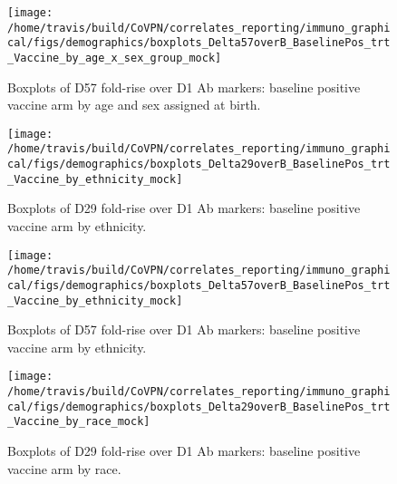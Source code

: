 \documentclass[]{book}
\theoremstyle{definition}
\theoremstyle{definition}
\theoremstyle{definition}
\newcommand{\1}{\mathbbm{1}}
\begin{document}
\clearpage
\begin{figure}[H]

{\centering \texttt{[image: /home/travis/build/CoVPN/correlates\_reporting/immuno\_graphical/figs/demographics/boxplots\_Delta57overB\_BaselinePos\_trt\_Vaccine\_by\_age\_x\_sex\_group\_mock]} 

}

\caption{Boxplots of D57 fold-rise over D1 Ab markers: baseline positive vaccine arm by age and sex assigned at birth.}\label{fig:unnamed-chunk-183}
\end{figure}

\clearpage

\clearpage

\clearpage
\begin{figure}[H]

{\centering \texttt{[image: /home/travis/build/CoVPN/correlates\_reporting/immuno\_graphical/figs/demographics/boxplots\_Delta29overB\_BaselinePos\_trt\_Vaccine\_by\_ethnicity\_mock]} 

}

\caption{Boxplots of D29 fold-rise over D1 Ab markers: baseline positive vaccine arm by ethnicity.}\label{fig:unnamed-chunk-186}
\end{figure}

\clearpage
\begin{figure}[H]

{\centering \texttt{[image: /home/travis/build/CoVPN/correlates\_reporting/immuno\_graphical/figs/demographics/boxplots\_Delta57overB\_BaselinePos\_trt\_Vaccine\_by\_ethnicity\_mock]} 

}

\caption{Boxplots of D57 fold-rise over D1 Ab markers: baseline positive vaccine arm by ethnicity.}\label{fig:unnamed-chunk-187}
\end{figure}

\clearpage

\clearpage

\clearpage
\begin{figure}[H]

{\centering \texttt{[image: /home/travis/build/CoVPN/correlates\_reporting/immuno\_graphical/figs/demographics/boxplots\_Delta29overB\_BaselinePos\_trt\_Vaccine\_by\_race\_mock]} 

}

\caption{Boxplots of D29 fold-rise over D1 Ab markers: baseline positive vaccine arm by race.}\label{fig:unnamed-chunk-190}
\end{figure}
\end{document}
